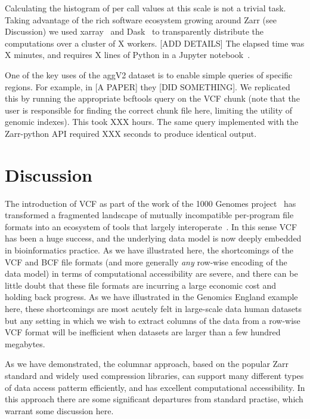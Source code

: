 \documentclass[a4paper,num-refs]{oup-contemporary}
\begin{document}
Calculating the histogram of per call values at this 
scale is not a trivial task.
Taking advantage of the rich software ecosystem growing around Zarr
(see Discussion) we used xarray~\citep{hoyer2017xarray}
and Dask~\citep{rocklin2015dask} to transparently distribute the 
computations over a cluster of X workers. 
[ADD DETAILS]
The elapsed time was X minutes, and requires X lines of Python in a 
Jupyter notebook~\citep{kluyver2016jupyter}. 

One of the key uses of the aggV2 dataset is to enable simple queries 
of specific regions. For example, in [A PAPER] they [DID SOMETHING].
We replicated this by running the appropriate bcftools query
on the VCF chunk (note that the user is responsible for finding 
the correct chunk file here, limiting the utility of genomic 
indexes). This took XXX hours.
The same query implemented with the Zarr-python 
API required XXX seconds to produce identical output.

\section{Discussion}
The introduction of VCF as part of the work of the 1000 Genomes
project~\cite{10002015global} has transformed a fragmented 
landscape of mutually incompatible per-program file formats
into an ecosystem of tools that largely
interoperate~\cite{garrison2022spectrum}. In this 
sense VCF has been a huge success, and the underlying data model
is now deeply embedded in bioinformatics practice. As we have 
illustrated here, the shortcomings of the VCF and BCF file
formats (and more generally \emph{any} row-wise encoding of the 
data model) in terms of computational accessibility are severe,
and there can be little doubt that these file formats 
are incurring a large economic cost and 
holding back progress. 
As we have illustrated in the Genomics England
example here, these shortcomings are most acutely felt in 
large-scale data human datasets but any setting in which we 
wish to extract columns of the data from a row-wise 
VCF format will be inefficient 
when datasets are larger than a few hundred megabytes.

As we have demonstrated, the columnar approach, based on the 
popular Zarr standard and widely used compression libraries, 
can support many different types of data access
patterm efficiently, and has excellent computational accessibility.
In this approach there are some significant departures from 
standard practise, which warrant some discussion here.
\end{document}
